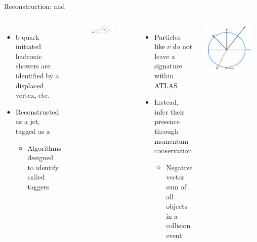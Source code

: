 \documentclass[aspectratio=169,xcolor=table]{beamer}
\begin{document}
  \begin{frame}[t]{Reconstruction: \bjets and \Etm}
     \begin{columns}[t]
      \begin{itemize}
        \item b quark initiated hadronic showers are identified by a displaced vertex, etc.
        \item Reconstructed as a jet, tagged as a \bjet
        \begin{itemize}
          \item Algorithms designed to identify \bjets called taggers \cite{b-tagging}
        \end{itemize}
      \end{itemize}
      \begin{figure}[!ht]
      \centering
      \includegraphics[width=.7\textwidth,keepaspectratio=true]{chapters/chapter5_eventreconnstruction/images/b-jet-schetch.png}
      \caption{\tiny \cite{bjet-trigger}}
      \end{figure}

        \begin{itemize}
          \item Particles like $\nu$ do not leave a signature within ATLAS
          \item Instead, infer their presence through momentum conservation
          \begin{itemize}
            \item Negative vector sum of all objects in a collision event
          \end{itemize}
        \end{itemize}
        \centering
        \includegraphics[width=.5\textwidth,keepaspectratio=true]{MET_Diagram.png}
      \end{columns}
    \end{frame}
\end{document}

